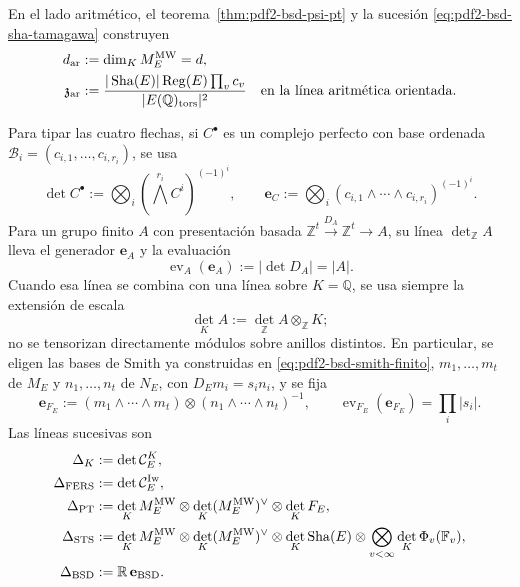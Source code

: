 En el lado aritmético, el teorema~\ref{thm:pdf2-bsd-psi-pt} y la sucesión
\eqref{eq:pdf2-bsd-sha-tamagawa} construyen
\begin{equation}\label{eq:pdf2-bsd-dar-zar}
 \begin{aligned}
 d_{\rm ar}&:=\dim_K M_E^{\rm MW}=d,\\
 \mathfrak z_{\rm ar}&:=
 \frac{|\operatorname{Sha}(E)|\operatorname{Reg}(E)\prod_vc_v}
 {|E(\mathbb Q)_{\rm tors}|^2}
 \quad\text{en la línea aritmética orientada}.
 \end{aligned}
\end{equation}

Para tipar las cuatro flechas, si $C^\bullet$ es un complejo perfecto con
base ordenada $\mathcal B_i=(c_{i,1},\ldots,c_{i,r_i})$, se usa
\begin{equation}\label{eq:pdf2-bsd-linea-determinante-base}
 \det C^\bullet:=
 \bigotimes_i\left(\bigwedge^{r_i}C^i\right)^{(-1)^i},
 \qquad
 \mathbf e_C:=\bigotimes_i
 (c_{i,1}\wedge\cdots\wedge c_{i,r_i})^{(-1)^i}.
\end{equation}
Para un grupo finito $A$ con presentación basada
$\mathbb Z^t\xrightarrow{D_A}\mathbb Z^t\to A$, su línea
$\det_{\mathbb Z}A$ lleva el generador $\mathbf e_A$ y la evaluación
\begin{equation}\label{eq:pdf2-bsd-evaluacion-grupo-finito}
 \operatorname{ev}_A(\mathbf e_A):=|\det D_A|=|A|.
\end{equation}
Cuando esa línea se combina con una línea sobre $K=\mathbb Q$, se usa siempre
la extensión de escala
\begin{equation}\label{eq:pdf2-bsd-linea-finita-k}
 \det_KA:=\det_{\mathbb Z}A\otimes_{\mathbb Z}K;
\end{equation}
no se tensorizan directamente módulos sobre anillos distintos.
En particular, se eligen las bases de Smith ya construidas en
\eqref{eq:pdf2-bsd-smith-finito}, $m_1,\ldots,m_t$ de $M_E$ y
$n_1,\ldots,n_t$ de $N_E$, con $D_Em_i=s_in_i$, y se fija
\begin{equation}\label{eq:pdf2-bsd-generador-smith-fe}
 \mathbf e_{F_E}:=
 (m_1\wedge\cdots\wedge m_t)\otimes
 (n_1\wedge\cdots\wedge n_t)^{-1},
 \qquad
 \operatorname{ev}_{F_E}(\mathbf e_{F_E})=\prod_i|s_i|.
\end{equation}
Las líneas sucesivas son
\begin{equation}\label{eq:pdf2-bsd-cinco-lineas-tipadas}
\begin{aligned}
 \Delta_K&:=\det\mathcal C_E^K,\\
 \Delta_{\rm FERS}&:=\det\mathcal C_E^{\rm Iw},\\
 \Delta_{\rm PT}&:=
   \det_K M_E^{\rm MW}\otimes
   \det_K(M_E^{\rm MW})^\vee\otimes\det_KF_E,\\
 \Delta_{\rm STS}&:=
   \det_K M_E^{\rm MW}\otimes
   \det_K(M_E^{\rm MW})^\vee\otimes
   \det_K\operatorname{Sha}(E)
   \otimes\bigotimes_{v<\infty}
      \det_K\Phi_v(\mathbb F_v),\\
 \Delta_{\rm BSD}&:=\mathbb R\,\mathbf e_{\rm BSD}.
\end{aligned}
\end{equation}

